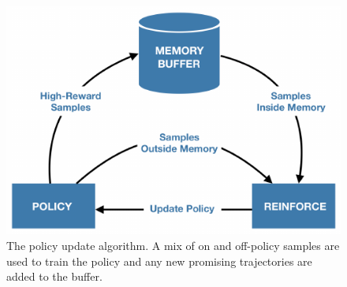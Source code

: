 \begin{figure}
\centering
\includegraphics[scale=1.0]{assets/figures/rl_update.pdf}
\caption{The policy update algorithm. A mix of on and off-policy samples are used to train the policy and any new promising trajectories are added to the buffer.}
\label{fig:rlupdate}
\end{figure}
